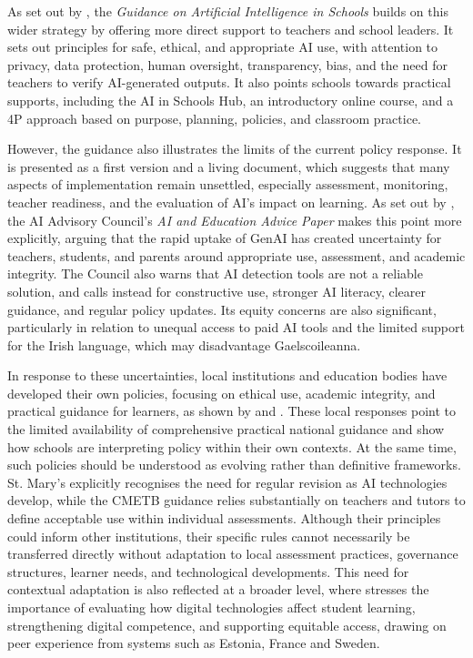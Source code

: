 As set out by \cite{govie2025ainschools}, the \textit{Guidance on Artificial
Intelligence in Schools} builds on this wider strategy by offering more direct
support to teachers and school leaders. It sets out principles for safe, ethical, and
appropriate AI use, with attention to privacy, data protection, human oversight,
transparency, bias, and the need for teachers to verify AI-generated outputs. It also
points schools towards practical supports, including the AI in Schools Hub, an
introductory online course, and a 4P approach based on purpose, planning, policies,
and classroom practice.

However, the guidance also illustrates the limits of the current policy response. It
is presented as a first version and a living document, which suggests that many
aspects of implementation remain unsettled, especially assessment, monitoring,
teacher readiness, and the evaluation of AI's impact on learning. As set out by
\cite{aiadvisorycouncil2025aieducation}, the AI Advisory Council's \textit{AI and
Education Advice Paper} makes this point more explicitly, arguing that the rapid
uptake of GenAI has created uncertainty for teachers, students, and parents around
appropriate use, assessment, and academic integrity. The Council also warns that AI
detection tools are not a reliable solution, and calls instead for constructive use,
stronger AI literacy, clearer guidance, and regular policy updates. Its equity
concerns are also significant, particularly in relation to unequal access to paid AI
tools and the limited support for the Irish language, which may disadvantage
Gaelscoileanna.

In response to these uncertainties, local institutions and education bodies have
developed their own policies, focusing on ethical use, academic integrity, and
practical guidance for learners, as shown by \cite{stmarys2025aipolicy} and
\cite{cmetb2025guide}. These local responses point to the limited availability of
comprehensive practical national guidance and show how schools are interpreting
policy within their own contexts. At the same time, such policies should be
understood as evolving rather than definitive frameworks. St. Mary's explicitly
recognises the need for regular revision as AI technologies develop, while the CMETB
guidance relies substantially on teachers and tutors to define acceptable use within
individual assessments. Although their principles could inform other institutions,
their specific rules cannot necessarily be transferred directly without adaptation to
local assessment practices, governance structures, learner needs, and technological
developments. This need for contextual adaptation is also reflected at a broader
level, where \cite{oecd2025ireland} stresses the importance of evaluating how digital
technologies affect student learning, strengthening digital competence, and
supporting equitable access, drawing on peer experience from systems such as Estonia,
France and Sweden.

